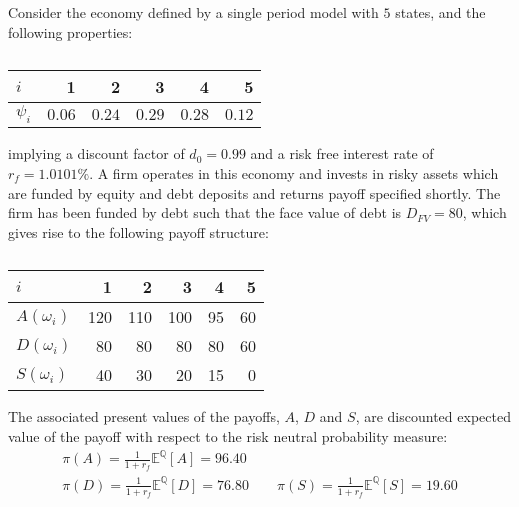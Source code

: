 \documentclass[main.tex]{subfiles}
\begin{document}
    Consider the economy defined by a single period model with $5$ states, and the following properties:
        \begin{table}[H]
            \centering
            \begin{tabular}{l|rrrrr}
                $i$ & 1 & 2 & 3 & 4 & 5 \\
                \hline
                $\psi_{i}$ & $0.06$ & $0.24$ & $0.29$ & $0.28$ & $0.12$ \\
            \end{tabular}
            \caption{}
            \label{tbl:example-firm-structure}
        \end{table}
    implying a discount factor of $d_{0} = 0.99$ and a risk free interest rate of $r_{f} = 1.0101\%$.
    A firm operates in this economy and invests in risky assets which are funded by equity and debt deposits and returns payoff specified shortly.
    The firm has been funded by debt such that the face value of debt is $D_{FV} = 80$, which gives rise to the following payoff structure:
    \begin{table}[H]
        \centering
        \begin{tabular}{l|rrrrr}
            $i$ & 1 & 2 & 3 & 4 & 5 \\
            \hline
            $A(\omega_{i})$ & 120 & 110 & 100 & 95 & 60 \\
            $D(\omega_{i})$ & 80 & 80 & 80 & 80 & 60 \\
            $S(\omega_{i})$ & 40 & 30 & 20 & 15 & 0
        \end{tabular}
        \caption{}
    \end{table}
    The associated present values of the payoffs, $A$, $D$ and $S$, are discounted expected value of the payoff with respect to the risk neutral probability measure:
        \begin{gather}
            \pi(A) = \frac{1}{1+r_{f}} \mathbb{E}^{\mathbb{Q}}\left[A\right] = 96.40 \\
            \pi(D) = \frac{1}{1+r_{f}} \mathbb{E}^{\mathbb{Q}}\left[D\right] = 76.80
            \qquad \pi(S) = \frac{1}{1+r_{f}} \mathbb{E}^{\mathbb{Q}}\left[S\right] = 19.60
        \end{gather}
\end{document}
